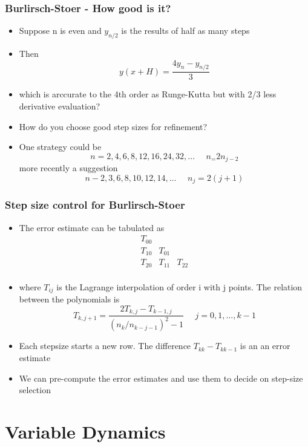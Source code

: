 \documentclass[10pt]{beamer}
\begin{document}
\begin{frame}
  \frametitle{Burlirsch-Stoer - How good is it? }
  \begin{itemize}
  \item Suppose n is even and $y_{n/2}$ is the results of half as many steps    
  \item Then
    \[
      y(x+H) = \frac{4 y_n - y_{n/2}}{3}
    \]
  \item which is arccurate to the 4th order as Runge-Kutta but with
    2/3 less derivative evaluation? 
  \item How do you choose good step sizes for refinement? \pause
  \item One strategy could be
    \[
      n = 2, 4, 6, 8, 12, 16, 24, 32, \ldots \mbox{~~~~} n_ = 2 n_{j-2}
    \]
    more recently a suggestion
    \[
      n - 2, 3, 6, 8, 10, 12, 14, \ldots \mbox{~~~~} n_j = 2(j+1)
    \]
  \end{itemize}  
\end{frame}

\begin{frame}
  \frametitle{Step size control for Burlirsch-Stoer}
  \begin{itemize}
  \item The error estimate can be tabulated as
    \[
      \begin{array}{lll}
        T_{00} && \\
        T_{10} & T_{01} & \\
        T_{20} & T_{11} & T_{22} \\
      \end{array}
    \]
  \item where $T_{ij}$ is the Lagrange interpolation of order i with j points. The relation between the polynomials is
    \[
      T_{k, j+1} = \frac{2 T_{k,j} - T_{k-1,j}}{(n_k / n_{k-j-1})^2 - 1} \mbox{~~~~} j = 0, 1, \ldots, k-1
    \]
  \item Each stepsize starts a new row. The difference
    $T_{kk} - T_{kk-1}$ is an an error estimate
  \item We can pre-compute the error estimates and use them to decide
    on step-size selection
  \end{itemize}
\end{frame}


\section{Variable Dynamics}
\end{document}
